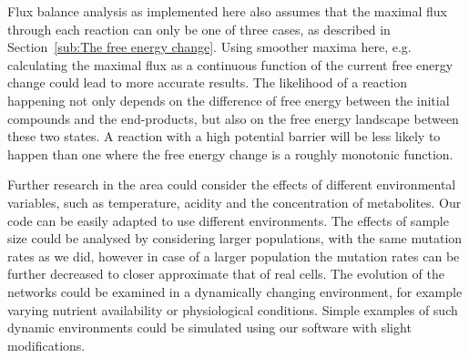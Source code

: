 \documentclass[a4paper,12pt]{article}
\begin{document}
Flux balance analysis as implemented here also assumes that the maximal flux through each reaction can only be one of three cases, as described in Section~\ref{sub:The free energy change}. Using smoother maxima here, e.g. calculating the maximal flux as a continuous function of the current free energy change could lead to more accurate results. The likelihood of a reaction happening not only depends on the difference of free energy between the initial compounds and the end-products, but also on the free energy landscape between these two states. A reaction with a high potential barrier will be less likely to happen than one where the free energy change is a roughly monotonic function. 



	
	
	
	Further research in the area could consider the effects of different environmental variables, such as temperature, acidity and the concentration of metabolites. Our code can be easily adapted to use different environments. The effects of sample size could be analysed by considering larger populations, with the same mutation rates as we did, however in case of a larger population the mutation rates can be further decreased to closer approximate that of real cells. The evolution of the networks could be examined in a dynamically changing environment, for example varying nutrient availability or physiological conditions. Simple examples of such dynamic environments could be simulated using our software with slight modifications. 
	
\end{document}
